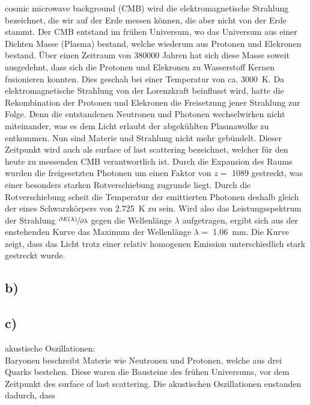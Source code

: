     \justifying cosmic microwave background (CMB) wird die elektromagnetische Strahlung bezeichnet, die wir auf der Erde messen können, die aber nicht von der Erde stammt. 
    Der CMB entstand im frühen Universum, wo das Universum aus einer Dichten Masse (Plasma) bestand, welche wiederum aus Protonen und Elekronen bestand. Über einen Zeitraum von 380000 Jahren
    hat sich diese Masse soweit ausgedehnt, dass sich die Protonen und Elekronen zu Wasserstoff Kernen fusionieren konnten. Dies geschah bei einer Temperatur von ca. 
    \SI{3000}{\kelvin}. Da elektromagnetische Strahlung von der Lorenzkraft beinflusst wird, hatte die Rekombination der Protonen und Elekronen die Freisetzung jener Strahlung zur Folge.
    Denn die entstandenen Neutronen und Photonen wechselwirken nicht miteinander, was es dem Licht erlaubt der abgekühlten Plasmawolke zu entkommen. Nun sind Materie und Strahlung nicht
    mehr gebündelt. Dieser Zeitpunkt wird auch als surface of last scattering bezeichnet, welcher für den heute zu messenden CMB verantwortlich ist. Durch die Expansion des Raums 
    wurden die freigesetzten Photonen um einen Faktor von $z=$ 1089 gestreckt, was einer besonders starken Rotverschiebung zugrunde liegt. Durch die Rotverschiebung scheit die Temperatur der emittierten Photonen
    deshalb gleich der eines Schwarzkörpers von \SI{2.725}{\kelvin} zu sein. Wird also das Leistungsspektrum der Strahlung $\sfrac{\partial E(\lambda)}{\partial \lambda}$ gegen die Wellenlänge
    $\lambda$ aufgetragen, ergibt sich aus der enstehenden Kurve das Maximum der Wellenlänge $\lambda=$ \SI{1.06}{\milli\meter}. Die Kurve zeigt, dass das Licht trotz einer relativ homogenen
    Emission unterschiedlich stark gestreckt wurde. 

\subsection{b)}




\subsection{c)}

    \justifying akustische Oszillationen:\\
    Baryonen beschreibt Materie wie Neutronen und Protonen, welche aus drei Quarks bestehen. Diese waren die Bausteine des frühen Universums, vor dem Zeitpunkt des surface of last scattering.
    Die akustischen Oszillationen enstanden dadurch, dass  \\

